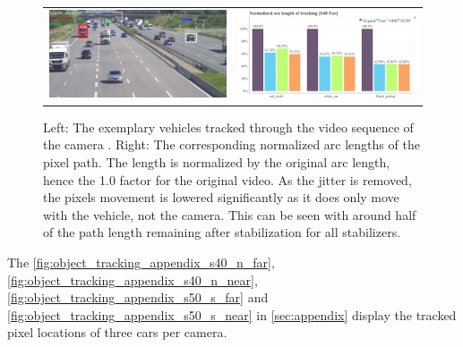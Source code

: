 \begin{figure}[!ht]
    \centering
    \begin{tabular}{cc}
      \includegraphics[width=0.475\linewidth]{diagrams/object_tracking/s40_n_far/frame_cropped.png}    &  
      \includegraphics[width=0.475\linewidth]{diagrams/object_tracking/s40_n_far/arcs.png}    
\end{tabular}
    \caption{Left: 
    The exemplary vehicles tracked through the video sequence of the camera . 
    Right:
    The corresponding normalized arc lengths of the pixel path. 
    The length is normalized by the original arc length, hence the 1.0 factor for the original video. 
    As the jitter is removed, the pixels movement is lowered significantly as it does only move with the vehicle, not the camera.
    This can be seen with around half of the path length remaining after stabilization for all stabilizers.
    }
    \label{fig:object_tracking_s40_n_far}
\end{figure}

The 
\autoref{fig:object_tracking_appendix_s40_n_far}, 
\autoref{fig:object_tracking_appendix_s40_n_near}, 
\autoref{fig:object_tracking_appendix_s50_s_far} and 
\autoref{fig:object_tracking_appendix_s50_s_near} in \autoref{sec:appendix} display the tracked pixel locations of three cars per camera.